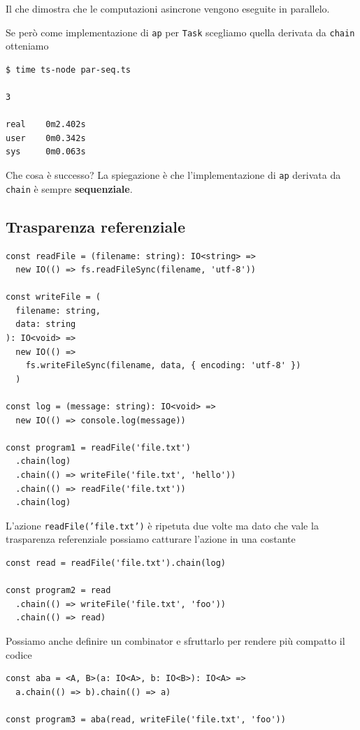 \documentclass[12pt]{article}
\begin{document}
Il che dimostra che le computazioni asincrone vengono eseguite in parallelo.

Se però come implementazione di \texttt{ap} per \texttt{Task} scegliamo quella derivata da \texttt{chain} otteniamo

\begin{verbatim}
$ time ts-node par-seq.ts

3

real    0m2.402s
user    0m0.342s
sys     0m0.063s
\end{verbatim}

Che cosa è successo? La spiegazione è che l'implementazione di \texttt{ap} derivata da \texttt{chain} è sempre \textbf{sequenziale}.

\subsection{Trasparenza referenziale}

\begin{verbatim}
const readFile = (filename: string): IO<string> =>
  new IO(() => fs.readFileSync(filename, 'utf-8'))

const writeFile = (
  filename: string,
  data: string
): IO<void> =>
  new IO(() =>
    fs.writeFileSync(filename, data, { encoding: 'utf-8' })
  )

const log = (message: string): IO<void> =>
  new IO(() => console.log(message))

const program1 = readFile('file.txt')
  .chain(log)
  .chain(() => writeFile('file.txt', 'hello'))
  .chain(() => readFile('file.txt'))
  .chain(log)
\end{verbatim}

L'azione \texttt{readFile('file.txt')} è ripetuta due volte ma dato che vale la trasparenza referenziale possiamo catturare l'azione in una costante

\begin{verbatim}
const read = readFile('file.txt').chain(log)

const program2 = read
  .chain(() => writeFile('file.txt', 'foo'))
  .chain(() => read)
\end{verbatim}

Possiamo anche definire un combinator e sfruttarlo per rendere più compatto il codice

\begin{verbatim}
const aba = <A, B>(a: IO<A>, b: IO<B>): IO<A> =>
  a.chain(() => b).chain(() => a)

const program3 = aba(read, writeFile('file.txt', 'foo'))
\end{verbatim}
\end{document}
